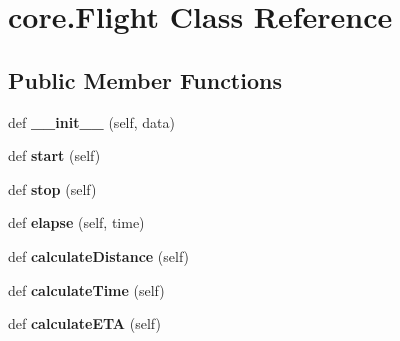 \hypertarget{classcore_1_1_flight}{}\section{core.\+Flight Class Reference}
\label{classcore_1_1_flight}
\subsection*{Public Member Functions}
\begin{DoxyCompactItemize}
\item 
\mbox{\label{classcore_1_1_flight_a5e63a16ebee102b6f9f7a680f26c8f4f}} 
def {\bfseries \+\_\+\+\_\+init\+\_\+\+\_\+} (self, data)
\item 
\mbox{\label{classcore_1_1_flight_a8eac439ce00d7e86cc474386ba615842}} 
def {\bfseries start} (self)
\item 
\mbox{\label{classcore_1_1_flight_a6a6604db5fc53d5496309ac61afd273b}} 
def {\bfseries stop} (self)
\item 
\mbox{\label{classcore_1_1_flight_a5d10f282a1b8d7e29a643b347ce0c01b}} 
def {\bfseries elapse} (self, time)
\item 
\mbox{\label{classcore_1_1_flight_a9354af3fbde570d93476380fa75e359e}} 
def {\bfseries calculate\+Distance} (self)
\item 
\mbox{\label{classcore_1_1_flight_a49ab19698e7256bf484e047a32325ada}} 
def {\bfseries calculate\+Time} (self)
\item 
\mbox{\label{classcore_1_1_flight_a0f1aff069abaad47b7ab697dc71a9a52}} 
def {\bfseries calculate\+E\+TA} (self)
\end{DoxyCompactItemize}

